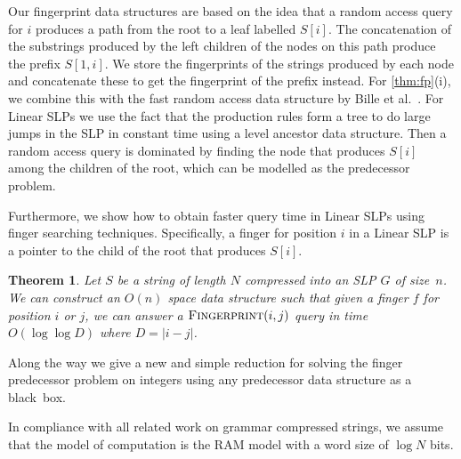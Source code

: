 \documentclass[11pt]{article}
\newtheorem{theorem}{Theorem}
\newcommand{\fingerprintq}{\ensuremath{\textsc{Fingerprint}}}
\newcommand{\slp}{\ensuremath{G} }
\begin{document}
Our fingerprint data structures are based on the idea that a random access query for $i$ produces a path from the root to a leaf labelled $S[i]$. The concatenation of the substrings produced by the left children of the nodes on this path produce the prefix $S[1,i]$. We store the fingerprints of the strings produced by each node and concatenate these to get the fingerprint of the prefix instead. For \autoref{thm:fp}(i), we combine this with the fast random access data structure by Bille et al.~\cite{bille2011random}. For Linear SLPs we use the fact that the production rules form a tree to do large jumps in the SLP in constant time using a level ancestor data structure. Then a random access query is dominated by finding the node that produces $S[i]$ among the children of the root, which can be modelled as the predecessor problem.

Furthermore, we show how to obtain faster query time in Linear SLPs using finger searching techniques. Specifically, a finger for position $i$ in a Linear SLP is a pointer to the child of the root that produces $S[i]$.



\begin{theorem}\label{thm:ffp}
Let $S$ be a string of length $N$ compressed into an SLP $\slp$ of size~$n$. We can construct an $O(n)$ space data structure such that given a finger $f$ for position $i$ or $j$, we can answer a $\fingerprintq(i, j)$ query in time $O(\log \log D)$ where $D = |i - j|$.
\end{theorem}

\noindent Along the way we give a new and simple reduction for solving the finger predecessor problem on integers using any predecessor data structure as a black~box.





In compliance with all related work on grammar compressed strings, we assume that the model of computation is the RAM model with a word size of $\log N$ bits.
\end{document}
